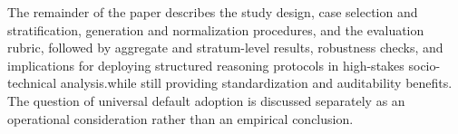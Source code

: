 The remainder of the paper describes the study design, case selection and stratification, generation and normalization procedures, and the evaluation rubric, followed by aggregate and stratum-level results, robustness checks, and implications for deploying structured reasoning protocols in high-stakes socio-technical analysis.while still providing standardization and auditability benefits. The question of universal default adoption is discussed separately as an operational consideration rather than an empirical conclusion.